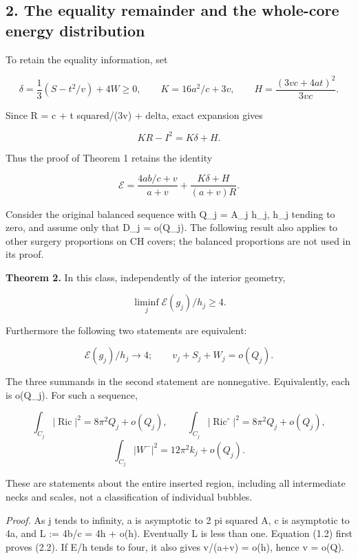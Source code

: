 \documentclass[
  10pt,
]{article}
\begin{document}
\hypertarget{the-equality-remainder-and-the-whole-core-energy-distribution}{%
\subsection{2. The equality remainder and the whole-core energy
distribution}\label{the-equality-remainder-and-the-whole-core-energy-distribution}}

To retain the equality information, set

\[
 \delta=\frac13(S-t^2/v)+4W\ge0,\qquad
 K=16a^2/c+3v,\qquad H=\frac{(3vc+4at)^2}{3vc}.
\]

Since R = c + t squared/(3v) + delta, exact expansion gives

\[
 KR-I^2=K\delta+H.
\]

Thus the proof of Theorem 1 retains the identity

\[
 \boxed{\mathcal E=
 \frac{4ab/c+v}{a+v}
       +\frac{K\delta+H}{(a+v)R}.}                       \tag{2.1}
\]

Consider the original balanced sequence with Q\_j = A\_j h\_j, h\_j
tending to zero, and assume only that D\_j = o(Q\_j). The following
result also applies to other surgery proportions on CH covers; the
balanced proportions are not used in its proof.

\textbf{Theorem 2.} In this class, independently of the interior
geometry,

\[
 \liminf_j\mathcal E(g_j)/h_j\ge4.                       \tag{2.2}
\]

Furthermore the following two statements are equivalent:

\[
 \mathcal E(g_j)/h_j\longrightarrow4;
 \qquad v_j+S_j+W_j=o(Q_j).                              \tag{2.3}
\]

The three summands in the second statement are nonnegative.
Equivalently, each is o(Q\_j). For such a sequence,

\[
 \int_{C_j}|\operatorname{Ric}|^2=8\pi^2Q_j+o(Q_j),
 \qquad \int_{C_j}|\operatorname{Ric}^{\circ}|^2
                                  =8\pi^2Q_j+o(Q_j),    \tag{2.4}
\] \[
 \int_{C_j}|W^-|^2=12\pi^2k_j+o(Q_j).                   \tag{2.5}
\]

These are statements about the entire inserted region, including all
intermediate necks and scales, not a classification of individual
bubbles.

\emph{Proof.} As j tends to infinity, a is asymptotic to 2 pi squared A,
c is asymptotic to 4a, and L := 4b/c = 4h + o(h). Eventually L is less
than one. Equation (1.2) first proves (2.2). If E/h tends to four, it
also gives v/(a+v) = o(h), hence v = o(Q).
\end{document}
